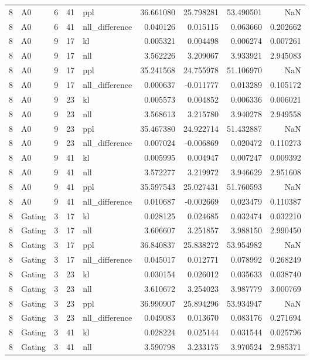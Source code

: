 \begin{tabular}{rlrrlrrrr}
8 & A0 & 6 & 41 & ppl & 36.661080 & 25.798281 & 53.490501 & NaN \\
8 & A0 & 6 & 41 & nll_difference & 0.040126 & 0.015115 & 0.063660 & 0.202662 \\
8 & A0 & 9 & 17 & kl & 0.005321 & 0.004498 & 0.006274 & 0.007261 \\
8 & A0 & 9 & 17 & nll & 3.562226 & 3.209067 & 3.933921 & 2.945083 \\
8 & A0 & 9 & 17 & ppl & 35.241568 & 24.755978 & 51.106970 & NaN \\
8 & A0 & 9 & 17 & nll_difference & 0.000637 & -0.011777 & 0.013289 & 0.105172 \\
8 & A0 & 9 & 23 & kl & 0.005573 & 0.004852 & 0.006336 & 0.006021 \\
8 & A0 & 9 & 23 & nll & 3.568613 & 3.215780 & 3.940278 & 2.949558 \\
8 & A0 & 9 & 23 & ppl & 35.467380 & 24.922714 & 51.432887 & NaN \\
8 & A0 & 9 & 23 & nll_difference & 0.007024 & -0.006869 & 0.020472 & 0.110273 \\
8 & A0 & 9 & 41 & kl & 0.005995 & 0.004947 & 0.007247 & 0.009392 \\
8 & A0 & 9 & 41 & nll & 3.572277 & 3.219972 & 3.946629 & 2.951608 \\
8 & A0 & 9 & 41 & ppl & 35.597543 & 25.027431 & 51.760593 & NaN \\
8 & A0 & 9 & 41 & nll_difference & 0.010687 & -0.002669 & 0.023479 & 0.110387 \\
8 & Gating & 3 & 17 & kl & 0.028125 & 0.024685 & 0.032474 & 0.032210 \\
8 & Gating & 3 & 17 & nll & 3.606607 & 3.251857 & 3.988150 & 2.990450 \\
8 & Gating & 3 & 17 & ppl & 36.840837 & 25.838272 & 53.954982 & NaN \\
8 & Gating & 3 & 17 & nll_difference & 0.045017 & 0.012771 & 0.078992 & 0.268249 \\
8 & Gating & 3 & 23 & kl & 0.030154 & 0.026012 & 0.035633 & 0.038740 \\
8 & Gating & 3 & 23 & nll & 3.610672 & 3.254023 & 3.987779 & 3.000769 \\
8 & Gating & 3 & 23 & ppl & 36.990907 & 25.894296 & 53.934947 & NaN \\
8 & Gating & 3 & 23 & nll_difference & 0.049083 & 0.013670 & 0.083176 & 0.271694 \\
8 & Gating & 3 & 41 & kl & 0.028224 & 0.025144 & 0.031544 & 0.025796 \\
8 & Gating & 3 & 41 & nll & 3.590798 & 3.233175 & 3.970524 & 2.985371 \\

\end{tabular}
